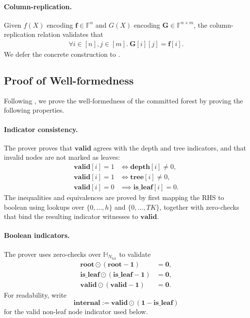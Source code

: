\paragraph{Column-replication.}
Given $f(X)$ encoding $\mathbf{f}\in \mathbb{F}^{n}$
    and $G(X)$ encoding $\mathbf{G}\in \mathbb{F}^{n\times m}$,
    the column-replication relation validates that 
    \begin{align}
        \forall i\in [n], j\in [m].\ \mathbf{G}[i][j] = \mathbf{f}[i].
    \end{align}
    We defer the concrete construction to .

\subsection{Proof of Well-formedness}\label{subsec:zkgbdt-well-formedness}

Following ,
    we prove the well-formedness of the committed forest by proving the following properties.

\paragraph{Indicator consistency.}
The prover proves that $\mathbf{valid}$ agrees with the depth and
tree indicators, and that invalid nodes are not marked as leaves:
\begin{align}
    \mathbf{valid}[i]=1 &\iff \mathbf{depth}[i] \neq {0},\\
    \mathbf{valid}[i]=1 &\iff \mathbf{tree}[i] \neq {0},\\
    \mathbf{valid}[i]=0 &\implies \mathbf{is\_leaf}[i] = {0}.
\end{align}
The inequalities and equivalences are proved by 
first mapping the RHS to boolean using lookups over
$\{0,\ldots,h\}$ and $\{0,\ldots,TK\}$, together with zero-checks that bind the
resulting indicator witnesses to $\mathbf{valid}$.

\paragraph{Boolean indicators.}
The prover uses zero-checks over $\mathbb{H}_{N_{\mathrm{tot}}}$ to validate
\begin{align}
    \mathbf{root}\odot(\mathbf{root}-\mathbf{1}) &= \mathbf{0},\\
    \mathbf{is\_leaf}\odot(\mathbf{is\_leaf}-\mathbf{1}) &= \mathbf{0},\\
    \mathbf{valid}\odot(\mathbf{valid}-\mathbf{1}) &= \mathbf{0}.
\end{align}
For readability, write
\[
    \mathbf{internal}:=\mathbf{valid}\odot(\mathbf{1}-\mathbf{is\_leaf})
\]
for the valid non-leaf node indicator used below.


